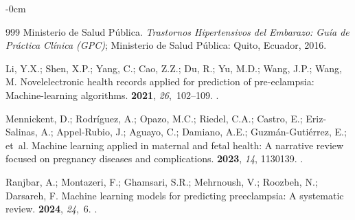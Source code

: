 \documentclass[diagnostics,article,accept,pdftex,moreauthors]{Definitions/mdpi}
\begin{document}
\begin{adjustwidth}{-\extralength}{0cm}
\begin{thebibliography}{999}
{Ministerio de Salud P\'ublica}.
\newblock \emph{Trastornos Hipertensivos del Embarazo: Gu\'ia de Pr\'actica Cl\'inica
  (GPC)};  {Ministerio de Salud P\'ublica:} %
 Quito, Ecuador, {2016}.
\newblock   %


Li, Y.X.; Shen, X.P.; Yang, C.; Cao, Z.Z.; Du, R.; Yu, M.D.; Wang, J.P.; Wang, M.
\newblock Novelelectronic health records applied for prediction of
  pre-eclampsia: Machine-learning algorithms.
 {\bf 2021}, {\em 26},~102--109.
.

Mennickent, D.; Rodr\'iguez, A.; Opazo, M.C.; Riedel, C.A.; Castro, E.;
  Eriz-Salinas, A.; Appel-Rubio, J.; Aguayo, C.; Damiano, A.E.;
  Guzm\'an-Guti\'errez, E.;  et~al.
\newblock Machine learning applied in maternal and fetal health: A narrative
  review focused on pregnancy diseases and complications.
 {\bf 2023}, {\em 14}, 1130139.
.

Ranjbar, A.; Montazeri, F.; Ghamsari, S.R.; Mehrnoush, V.; Roozbeh, N.;
  Darsareh, F.
\newblock Machine learning models for predicting preeclampsia: A systematic
  review.
 {\bf 2024}, {\em 24},~6.
.


\end{thebibliography}
\end{adjustwidth}
\end{document}
